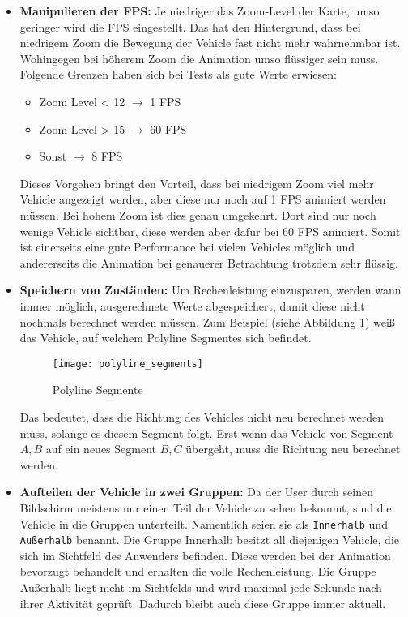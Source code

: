     \begin{itemize}
      \item \textbf{Manipulieren der FPS:} Je niedriger das Zoom-Level der Karte, umso geringer wird die FPS eingestellt. Das hat den Hintergrund, dass bei niedrigem Zoom die Bewegung der Vehicle fast nicht mehr wahrnehmbar ist. Wohingegen bei höherem Zoom die Animation umso flüssiger sein muss. Folgende Grenzen haben sich bei Tests als gute Werte erwiesen:
      \begin{itemize}
        \item Zoom Level < 12 $\rightarrow$ 1 FPS
        \item Zoom Level > 15 $\rightarrow$ 60 FPS
        \item Sonst $\rightarrow$ 8 FPS
      \end{itemize}
      Dieses Vorgehen bringt den Vorteil, dass bei niedrigem Zoom viel mehr Vehicle angezeigt werden, aber diese nur noch auf 1 FPS animiert werden müssen. Bei hohem Zoom ist dies genau umgekehrt. Dort sind nur noch wenige Vehicle sichtbar, diese werden aber dafür bei 60 FPS animiert. Somit ist einerseits eine gute Performance bei vielen Vehicles möglich und andererseits die Animation bei genauerer Betrachtung trotzdem sehr flüssig.

      \item \textbf{Speichern von Zuständen:} Um Rechenleistung einzusparen, werden wann immer möglich, ausgerechnete Werte abgespeichert, damit diese nicht nochmals berechnet werden müssen. Zum Beispiel (siehe Abbildung \ref{fig:polyline_segments}) weiß das Vehicle, auf welchem Polyline Segment\footnotemark es sich befindet. 


      \begin{figure}[htbp]
        \begin{center}
          \texttt{[image: polyline\_segments]}
          \caption{Polyline Segmente}
          \label{fig:polyline_segments}
        \end{center}
      \end{figure}

      Das bedeutet, dass die Richtung des Vehicles nicht neu berechnet werden muss, solange es diesem Segment folgt. Erst wenn das Vehicle von Segment $A,B$ auf ein neues Segment $B,C$ übergeht, muss die Richtung neu berechnet werden.

      \item \textbf{Aufteilen der Vehicle in zwei Gruppen:} Da der User durch seinen Bildschirm meistens nur einen Teil der Vehicle zu sehen bekommt, sind die Vehicle in die Gruppen unterteilt. Namentlich seien sie als \texttt{Innerhalb} und \texttt{Außerhalb} benannt. Die Gruppe Innerhalb besitzt all diejenigen Vehicle, die sich im Sichtfeld des Anwenders befinden. Diese werden bei der Animation bevorzugt behandelt und erhalten die volle Rechenleistung. Die Gruppe Außerhalb liegt nicht im Sichtfelds und wird maximal jede Sekunde nach ihrer Aktivität geprüft. Dadurch bleibt auch diese Gruppe immer aktuell.      
    \end{itemize}

  
